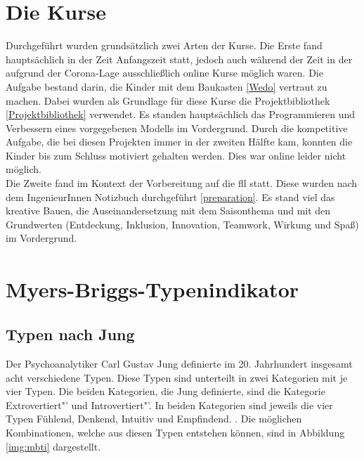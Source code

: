 \section{Die Kurse}
Durchgeführt wurden grundsätzlich zwei Arten der Kurse. Die Erste fand hauptsächlich in der Zeit Anfangszeit statt, jedoch auch während der Zeit in der aufgrund der Corona-Lage ausschließlich online Kurse möglich waren. Die Aufgabe bestand darin, die Kinder mit dem Baukasten \ref{Wedo} vertraut zu machen. Dabei wurden als Grundlage für diese Kurse die Projektbibliothek \ref{Projektbibliothek} verwendet. Es standen hauptsächlich das Programmieren und Verbessern eines vorgegebenen Modells im Vordergrund. Durch die kompetitive Aufgabe, die bei diesen Projekten immer in der zweiten Hälfte kam, konnten die Kinder bis zum Schluss motiviert gehalten werden. Dies war online leider nicht möglich.\\
Die Zweite fand im Kontext der Vorbereitung auf die \acrlong{fll} statt. Diese wurden nach dem IngenieurInnen Notizbuch durchgeführt \ref{preparation}. Es stand viel das kreative Bauen, die Auseinandersetzung mit dem Saisonthema und mit den Grundwerten (Entdeckung, Inklusion, Innovation, Teamwork, Wirkung und Spaß) im Vordergrund. 





\section{Myers-Briggs-Typenindikator\textsuperscript{\textregistered}} 
\subsection{Typen nach Jung}
Der Psychoanalytiker Carl Gustav Jung definierte im 20. Jahrhundert insgesamt acht verschiedene Typen. Diese Typen sind unterteilt in zwei Kategorien mit je vier Typen. Die beiden Kategorien, die Jung definierte, sind die Kategorie \glqq Extrovertiert"' und \glqq Introvertiert"'. In beiden Kategorien sind jeweils die vier Typen Fühlend, Denkend, Intuitiv und Empfindend. \cite{jung_1921}. Die möglichen Kombinationen, welche aus diesen Typen entstehen können, sind in Abbildung \ref{img:mbti} dargestellt.\\

